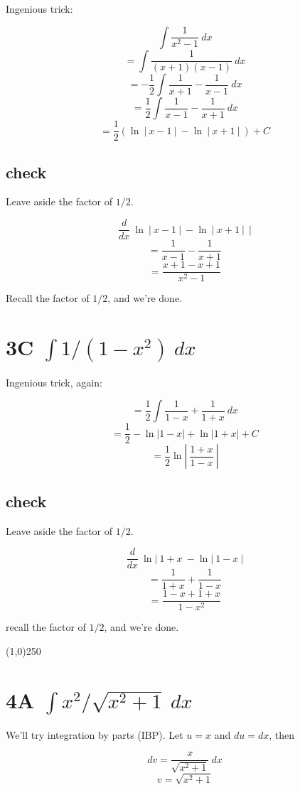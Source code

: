 \documentclass[11pt, oneside]{article}
\begin{document}
Ingenious trick:

\[ \int \frac{1}{x^2-1} \ dx \]
\[ = \int \frac{1}{(x+1)(x-1)} \ dx \]
\[ = -\frac{1}{2} \int \frac{1}{x+1} - \frac{1}{x-1} \ dx \]
\[ = \frac{1}{2}  \int \frac{1}{x-1} - \frac{1}{x+1} \ dx \]
\[ = \frac{1}{2} ( \ln \ | \ x - 1 \ | \ - \ln \ | \ x + 1 \ | \ ) + C \]

\subsection*{check}

Leave aside the factor of $1/2$.

\[ \frac{d}{dx} \ \ln \ | \ x - 1 \ | \ - \ln \ | \ x + 1 \ | \ \ | \]
\[ = \frac{1}{x-1} - \frac{1}{x + 1} \]
\[ = \frac{x + 1 - x + 1}{x^2 - 1} \]

Recall the factor of $1/2$, and we're done.

\section*{3C $\int 1/(1 - x^2) \ dx$}

Ingenious trick, again:

\[ = \frac{1}{2} \int \frac{1}{1-x} + \frac{1}{1 + x} \ dx \]
\[ = \frac{1}{2} -\ln |1-x| + \ln |1+x| + C \]
\[ = \frac{1}{2} \ln | \ \frac{1+x}{1-x} \ |\]

\subsection*{check}

Leave aside the factor of $1/2$.

\[ \frac{d}{dx} \ \ln | \ 1 + x \  - \ln | \ 1 - x \ | \]
\[ = \frac{1}{1+x} + \frac{1}{1-x} \]
\[ = \frac{1 - x + 1 + x}{1 - x^2} \]

recall the factor of $1/2$, and we're done.

\begin{center} \line(1,0){250} \end{center}

\section*{4A $\int x^2/\sqrt{x^2 + 1} \ dx$ }

We'll try integration by parts (IBP).  Let $u = x$ and $du = dx$, then

\[ dv = \frac{x}{\sqrt{x^2 + 1}} \ dx \]
\[ v = \sqrt{x^2 + 1} \]
\end{document}
